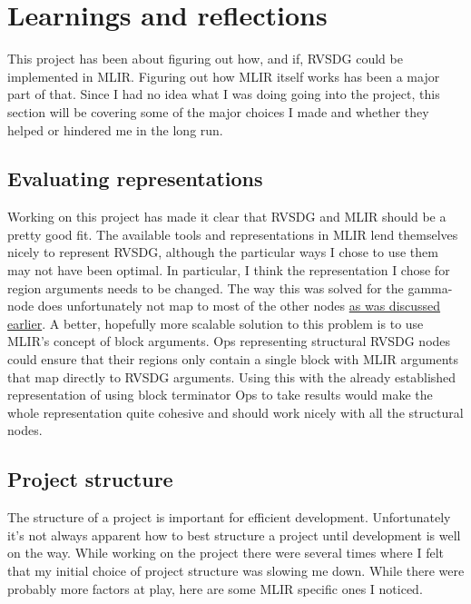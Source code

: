 \section{Learnings and reflections} \label{sec:learnings}
This project has been about figuring out how, and if, RVSDG could be implemented in MLIR. Figuring out how MLIR itself works has been a major part of that. Since I had no idea what I was doing going into the project, this section will be covering some of the major choices I made and whether they helped or hindered me in the long run.

\subsection{Evaluating representations}
Working on this project has made it clear that RVSDG and MLIR should be a pretty good fit. The available tools and representations in MLIR lend themselves nicely to represent RVSDG, although the particular ways I chose to use them may not have been optimal. In particular, I think the representation I chose for region arguments needs to be changed. The way this was solved for the gamma-node does unfortunately not map to most of the other nodes \hyperref[sec:chosen-representations]{as was discussed earlier}. A better, hopefully more scalable solution to this problem is to use MLIR's concept of block arguments. Ops representing structural RVSDG nodes could ensure that their regions only contain a single block with MLIR arguments that map directly to RVSDG arguments. Using this with the already established representation of using block terminator Ops to take results would make the whole representation quite cohesive and should work nicely with all the structural nodes.

\subsection{Project structure}
The structure of a project is important for efficient development. Unfortunately it's not always apparent how to best structure a project until development is well on the way. While working on the project there were several times where I felt that my initial choice of project structure was slowing me down. While there were probably more factors at play, here are some MLIR specific ones I noticed.

